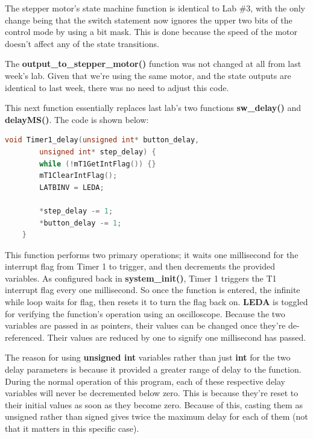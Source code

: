 \documentclass[a4paper, 12pt]{article}
\begin{document}
The stepper motor's state machine function is identical to Lab \#3, with the only change being that the switch statement now ignores the upper two bits of the control mode by using a bit mask. This is done because the speed of the motor doesn't affect any of the state transitions.

The \textbf{output\_to\_stepper\_motor()} function was not changed at all from last week's lab. Given that we're using the same motor, and the state outputs are identical to last week, there was no need to adjust this code.

This next function essentially replaces last lab's two functions \textbf{sw\_delay()} and \textbf{delayMS()}. The code is shown below:

	\begin{mdframed}[backgroundcolor=code-gray, roundcorner=10pt,
								innerleftmargin=5, innertopmargin=5, innerbottommargin=5]	
	\begin{lstlisting}[language=C, caption=One Millisecond Timer Loop, tabsize=2]
	void Timer1_delay(unsigned int* button_delay,
		unsigned int* step_delay) {
		while (!mT1GetIntFlag()) {}
		mT1ClearIntFlag();	
		LATBINV = LEDA;

		*step_delay -= 1;
		*button_delay -= 1;
	}
	\end{lstlisting}
	\end{mdframed}
	
This function performs two primary operations; it waits one millisecond for the interrupt flag from Timer 1 to trigger, and then decrements the provided variables. As configured back in \textbf{system\_init()}, Timer 1 triggers the T1 interrupt flag every one millisecond. So once the function is entered, the infinite while loop waits for flag, then resets it to turn the flag back on. \textbf{LEDA} is toggled for verifying the function's operation using an oscilloscope. Because the two variables are passed in as pointers, their values can be changed once they're de-referenced. Their values are reduced by one to signify one millisecond has passed.

The reason for using \textbf{unsigned int} variables rather than just \textbf{int} for the two delay parameters is because it provided a greater range of delay to the function. During the normal operation of this program, each of these respective delay variables will never be decremented below zero. This is because they're reset to their initial values as soon as they become zero. Because of this, casting them as unsigned rather than signed gives twice the maximum delay for each of them (not that it matters in this specific case). 
\end{document}
